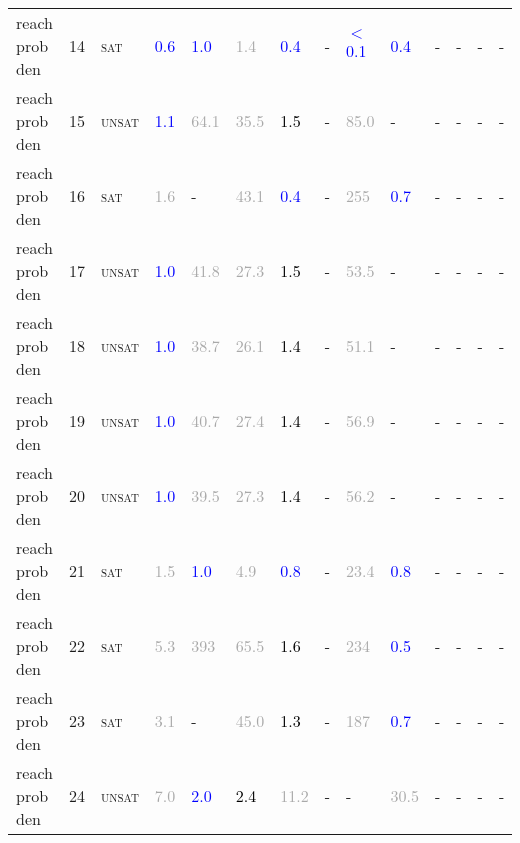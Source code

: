 \begin{center}
{\begin{longtable}{@{}llllllllllllll@{}}
reach prob den & 14 & \textsc{sat} & \textcolor{blue}{0.6} & \textcolor{blue}{1.0} & \textcolor{darkgray}{1.4} & \textcolor{blue}{0.4} & - & \textcolor{blue}{$<$0.1} & \textcolor{blue}{0.4} & - & - & - & - \\
reach prob den & 15 & \textsc{unsat} & \textcolor{blue}{1.1} & \textcolor{darkgray}{64.1} & \textcolor{darkgray}{35.5} & \textcolor{black}{1.5} & - & \textcolor{darkgray}{85.0} & - & - & - & - & - \\
reach prob den & 16 & \textsc{sat} & \textcolor{darkgray}{1.6} & - & \textcolor{darkgray}{43.1} & \textcolor{blue}{0.4} & - & \textcolor{darkgray}{255} & \textcolor{blue}{0.7} & - & - & - & - \\
reach prob den & 17 & \textsc{unsat} & \textcolor{blue}{1.0} & \textcolor{darkgray}{41.8} & \textcolor{darkgray}{27.3} & \textcolor{black}{1.5} & - & \textcolor{darkgray}{53.5} & - & - & - & - & - \\
reach prob den & 18 & \textsc{unsat} & \textcolor{blue}{1.0} & \textcolor{darkgray}{38.7} & \textcolor{darkgray}{26.1} & \textcolor{black}{1.4} & - & \textcolor{darkgray}{51.1} & - & - & - & - & - \\
reach prob den & 19 & \textsc{unsat} & \textcolor{blue}{1.0} & \textcolor{darkgray}{40.7} & \textcolor{darkgray}{27.4} & \textcolor{black}{1.4} & - & \textcolor{darkgray}{56.9} & - & - & - & - & - \\
reach prob den & 20 & \textsc{unsat} & \textcolor{blue}{1.0} & \textcolor{darkgray}{39.5} & \textcolor{darkgray}{27.3} & \textcolor{black}{1.4} & - & \textcolor{darkgray}{56.2} & - & - & - & - & - \\
reach prob den & 21 & \textsc{sat} & \textcolor{darkgray}{1.5} & \textcolor{blue}{1.0} & \textcolor{darkgray}{4.9} & \textcolor{blue}{0.8} & - & \textcolor{darkgray}{23.4} & \textcolor{blue}{0.8} & - & - & - & - \\
reach prob den & 22 & \textsc{sat} & \textcolor{darkgray}{5.3} & \textcolor{darkgray}{393} & \textcolor{darkgray}{65.5} & \textcolor{black}{1.6} & - & \textcolor{darkgray}{234} & \textcolor{blue}{0.5} & - & - & - & - \\
reach prob den & 23 & \textsc{sat} & \textcolor{darkgray}{3.1} & - & \textcolor{darkgray}{45.0} & \textcolor{black}{1.3} & - & \textcolor{darkgray}{187} & \textcolor{blue}{0.7} & - & - & - & - \\
reach prob den & 24 & \textsc{unsat} & \textcolor{darkgray}{7.0} & \textcolor{blue}{2.0} & \textcolor{black}{2.4} & \textcolor{darkgray}{11.2} & - & - & \textcolor{darkgray}{30.5} & - & - & - & - \\

\end{longtable}}
\end{center}
